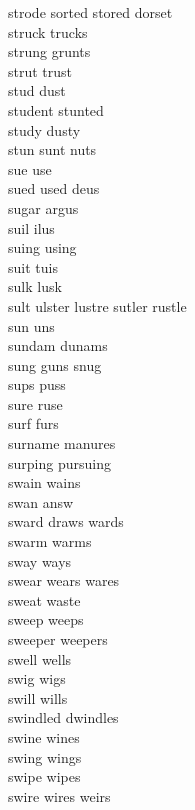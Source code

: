 strode sorted stored dorset\\
struck trucks\\
strung grunts\\
strut trust\\
stud dust\\
student stunted\\
study dusty\\
stun sunt nuts\\
sue use\\
sued used deus\\
sugar argus\\
suil ilus\\
suing using\\
suit tuis\\
sulk lusk\\
sult ulster lustre sutler rustle  \\
sun uns\\
sundam dunams\\
sung guns snug\\
sups puss\\
sure ruse\\
surf furs\\
surname manures\\
surping pursuing \\
swain wains\\
swan answ\\
sward draws wards\\
swarm warms\\
sway ways\\
swear wears wares\\
sweat waste\\
sweep weeps\\
sweeper weepers\\
swell wells\\
swig wigs\\
swill wills\\
swindled dwindles\\
swine wines\\
swing wings\\
swipe wipes\\
swire wires weirs\\

